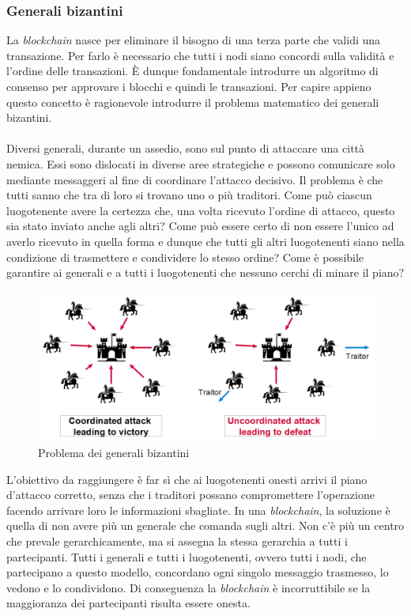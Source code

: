 \subsubsection{Generali bizantini}
La \textit{blockchain} nasce per eliminare il bisogno di una terza parte che validi una transazione. Per farlo è necessario che tutti i nodi siano concordi sulla validità e l’ordine delle transazioni. È dunque fondamentale introdurre un algoritmo di consenso per approvare i blocchi e quindi le transazioni. Per capire appieno questo concetto è ragionevole introdurre il problema matematico dei generali bizantini.\\\\
Diversi generali, durante un assedio, sono sul punto di attaccare una città nemica. Essi sono dislocati in diverse aree strategiche e possono comunicare solo mediante messaggeri al fine di coordinare l’attacco decisivo.
Il problema è che tutti sanno che tra di loro si trovano uno o più traditori. 
Come può ciascun luogotenente avere la certezza che, una volta ricevuto l’ordine di attacco, questo sia stato inviato anche agli altri? Come può essere certo di non essere l’unico ad averlo ricevuto in quella forma e dunque che tutti gli altri luogotenenti siano nella condizione di trasmettere e condividere lo stesso ordine?
Come è possibile garantire ai generali e a tutti i luogotenenti che nessuno cerchi di minare il piano?
\begin{figure}[h]
\caption{Problema dei generali bizantini}
\centering
\includegraphics[width=1.0\textwidth]{./immagini/bizantini}
\end{figure}

L'obiettivo da raggiungere è far sì che ai luogotenenti onesti arrivi il piano d’attacco corretto, senza che i traditori possano compromettere l’operazione facendo arrivare loro le informazioni sbagliate.
In una \textit{blockchain}, la soluzione è quella di non avere più un generale che comanda sugli altri. Non c’è più un centro che prevale gerarchicamente, ma si assegna la stessa gerarchia a tutti i partecipanti. Tutti i generali e tutti i luogotenenti, ovvero tutti i nodi, che partecipano a questo modello, concordano ogni singolo messaggio trasmesso, lo vedono e lo condividono. Di conseguenza la \textit{blockchain} è incorruttibile se la maggioranza dei partecipanti risulta essere onesta.


